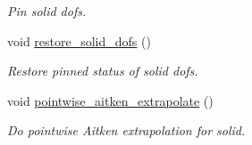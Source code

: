 \begin{DoxyCompactItemize}
\begin{DoxyCompactList}\small\item\em Pin solid dofs. \end{DoxyCompactList}\item 
void \hyperlink{classoomph_1_1SegregatableFSIProblem_a6da202671582bf7bf13a3dceb115385f}{restore\+\_\+solid\+\_\+dofs} ()
\begin{DoxyCompactList}\small\item\em Restore pinned status of solid dofs. \end{DoxyCompactList}\item 
void \hyperlink{classoomph_1_1SegregatableFSIProblem_a99a457e1b3c17e9a08590db163eb7118}{pointwise\+\_\+aitken\+\_\+extrapolate} ()
\begin{DoxyCompactList}\small\item\em Do pointwise Aitken extrapolation for solid. \end{DoxyCompactList}\end{DoxyCompactItemize}
